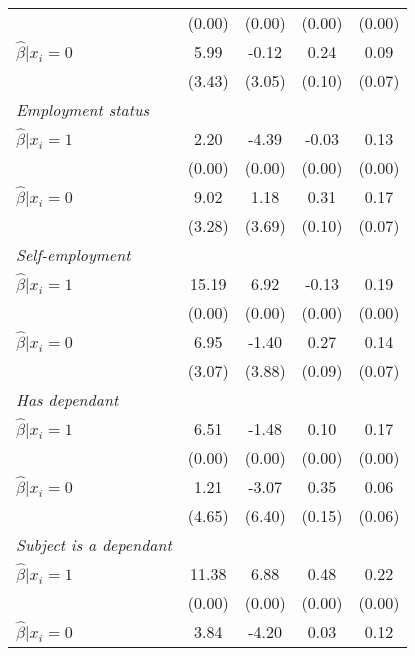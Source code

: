 \begin{table}[h]
{\begin{threeparttable}
\begin{tabular}{l*{4}{c}}
                &   (0.00)&   (0.00)&   (0.00)&   (0.00)\\
\hspace{0.5cm} \(\hat\beta|x_i=0\)&     5.99&    -0.12&     0.24&     0.09\\
                &   (3.43)&   (3.05)&   (0.10)&   (0.07)\\
\textit{Employment status}&         &         &         &         \\
\hspace{0.5cm} \(\hat\beta|x_i=1\)&     2.20&    -4.39&    -0.03&     0.13\\
                &   (0.00)&   (0.00)&   (0.00)&   (0.00)\\
\hspace{0.5cm} \(\hat\beta|x_i=0\)&     9.02&     1.18&     0.31&     0.17\\
                &   (3.28)&   (3.69)&   (0.10)&   (0.07)\\
\textit{Self-employment}&         &         &         &         \\
\hspace{0.5cm} \(\hat\beta|x_i=1\)&    15.19&     6.92&    -0.13&     0.19\\
                &   (0.00)&   (0.00)&   (0.00)&   (0.00)\\
\hspace{0.5cm} \(\hat\beta|x_i=0\)&     6.95&    -1.40&     0.27&     0.14\\
                &   (3.07)&   (3.88)&   (0.09)&   (0.07)\\
\textit{Has dependant}&         &         &         &         \\
\hspace{0.5cm} \(\hat\beta|x_i=1\)&     6.51&    -1.48&     0.10&     0.17\\
                &   (0.00)&   (0.00)&   (0.00)&   (0.00)\\
\hspace{0.5cm} \(\hat\beta|x_i=0\)&     1.21&    -3.07&     0.35&     0.06\\
                &   (4.65)&   (6.40)&   (0.15)&   (0.06)\\
\textit{Subject is a dependant}&         &         &         &         \\
\hspace{0.5cm} \(\hat\beta|x_i=1\)&    11.38&     6.88&     0.48&     0.22\\
                &   (0.00)&   (0.00)&   (0.00)&   (0.00)\\
\hspace{0.5cm} \(\hat\beta|x_i=0\)&     3.84&    -4.20&     0.03&     0.12\\

\end{tabular}
\end{threeparttable}}
\end{table}
